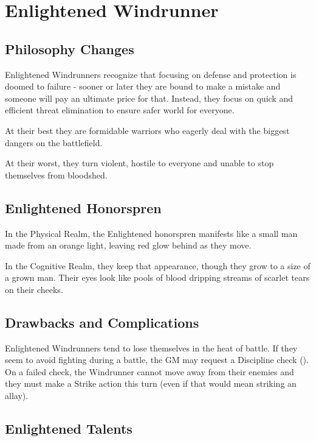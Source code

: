 \newpage
\section{Enlightened Windrunner}


\subsection{Philosophy Changes}

Enlightened Windrunners recognize that focusing on defense and protection is doomed to failure - sooner or later they are bound to make a mistake and someone will pay an ultimate price for that. Instead, they focus on quick and efficient threat elimination to ensure safer world for everyone.

At their best they are formidable warriors who eagerly deal with the biggest dangers on the battlefield.

At their worst, they turn violent, hostile to everyone and unable to stop themselves from bloodshed.

\subsection{Enlightened Honorspren}

In the Physical Realm, the Enlightened honorspren manifests like a small man made from an orange light, leaving red glow behind as they move.

In the Cognitive Realm, they keep that appearance, though they grow to a size of a grown man. Their eyes look like pools of blood dripping streams of scarlet tears on their cheeks.

\subsection{Drawbacks and Complications}

Enlightened Windrunners tend to lose themselves in the heat of battle. If they seem to avoid fighting during a battle, the GM may request a Discipline check (\corruptedResistanceDC{}). On a failed check, the Windrunner cannot move away from their enemies and they must make a Strike action this turn (even if that would mean striking an allay).

\newpage
\subsection{Enlightened Talents}

